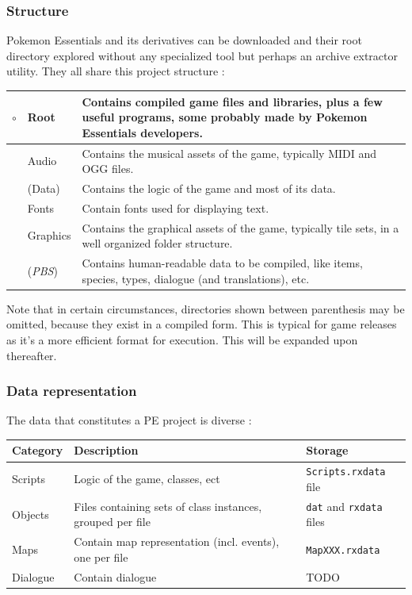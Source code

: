 \documentclass[11pt]{article}
\begin{document}
\subsubsection{Structure}

Pokemon Essentials and its derivatives can be downloaded and their root directory explored without any specialized tool but perhaps an archive extractor utility. They all share this project structure :

\begin{tabular}{|r L{.1\linewidth}|L{.8\linewidth}|}
	\hline
	$\circ$ & Root & Contains compiled game files and libraries, plus a few useful programs, some probably made by Pokemon Essentials developers. \\
	\hline
	 & Audio & Contains the musical assets of the game, typically MIDI and OGG files. \\
	\hline
	 & (Data) & Contains the logic of the game and most of its data.  \\
	\hline
	 & Fonts & Contain fonts used for displaying text. \\
	\hline
	 & Graphics & Contains the graphical assets of the game, typically tile sets, in a well organized folder structure. \\
	\hline
	 & (\textit{PBS}) & Contains human-readable data to be compiled, like items, species, types, dialogue (and translations), etc. \\
	\hline
\end{tabular}

Note that in certain circumstances, directories shown between parenthesis may be omitted, because they exist in a compiled form. This is typical for game releases as it's a more efficient format for execution. This will be expanded upon thereafter.


\subsubsection{Data representation}

The data that constitutes a PE project is diverse :

\begin{tabular}{|L{.1\textwidth}|L{.52\textwidth}|L{.3\textwidth}|}
	\hline
	\textbf{Category} & \textbf{Description} & \textbf{Storage} \\
	\hline
	Scripts & Logic of the game, classes, ect & \verb|Scripts.rxdata| file \\
	\hline
	Objects & Files containing sets of class instances, grouped per file & \verb|dat| and \verb|rxdata| files \\
	\hline
	Maps & Contain map representation (incl. events), one per file & \verb|MapXXX.rxdata| \\
	\hline
	Dialogue & Contain dialogue & TODO \\
	\hline
\end{tabular}
\end{document}
